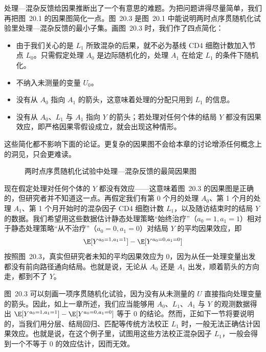 处理—混杂反馈给因果推断出了一个有意思的难题。为把问题讲得尽量简单，我们再把图~20.1 的因果图简化一点。图~20.3 是图~20.1 中能说明两时点序贯随机化试验里处理—混杂反馈的最小子集。画图~20.3 时，我们作了四点简化：

\begin{itemize}
\item 由于我们关心的是 $L_1$ 所致混杂的后果，就不必为基线 CD4 细胞计数加入节点 $L_0$。只需假定处理 $A_0$ 是边际随机化的，处理 $A_1$ 在给定 $L_1$ 的条件下随机化。
\item 不纳入未测量的变量 $U_0$。
\item 没有从 $A_0$ 指向 $A_1$ 的箭头，这意味着处理的分配只用到 $L_1$ 的信息。
\item 没有从 $A_0$、$L_1$ 与 $A_1$ 指向 $Y$ 的箭头；若处理对任何个体的结局 $Y$ 都没有因果效应，即严格因果零假设成立，就会出现这种情形。
\end{itemize}

这些简化都不影响下面的论证。更复杂的因果图不会给本章的讨论增添任何概念上的洞见，只会更难读。

\begin{figure}[htbp]
\centering
{}
\caption{两时点序贯随机化试验中处理—混杂反馈的最简因果图}
\label{fig:20.3}
\end{figure}

现在假定处理对任何个体的 $Y$ 都没有效应——这意味着图~20.3 的因果图是正确的，但研究者并不知道这一点。再假定我们有第 0 个月的处理 $A_0$、第 1 个月的处理 $A_1$、第 1 个月开始时的混杂因子 CD4 细胞计数 $L_1$，以及随访结束时的结局 $Y$ 的数据。我们希望用这些数据估计静态处理策略“始终治疗”（$a_0=1,a_1=1$）相对于静态处理策略“从不治疗”（$a_0=0,a_1=0$）对结局 $Y$ 的平均因果效应，即
\[
\E[Y^{a_0=1,a_1=1}]-\E[Y^{a_0=0,a_1=0}]
\]
按照图~20.3，真实但研究者未知的平均因果效应为 0，因为从任一处理变量出发都没有前向路径通向结局。也就是说，无论从 $A_0$ 还是 $A_1$ 出发，顺着箭头的方向走，都到不了 $Y$。

图~20.3 可以刻画一项序贯随机化试验，因为没有从未测量的 $U$ 直接指向处理变量的箭头。因此，如上一章所述，我们应当能够用 $A_0$、$L_1$、$A_1$ 与 $Y$ 的观测数据得出 $\E[Y^{a_0=1,a_1=1}]-\E[Y^{a_0=0,a_1=0}]$ 等于 0 的结论。然而，正如下一节将要说明的，当我们用分层、结局回归、匹配等传统方法校正 $L_1$ 时，一般无法正确估计因果效应。也就是说，在这个例子里，试图用这些方法校正混杂因子 $L_1$，一般会得到一个不等于 0 的效应估计，因而无效。

